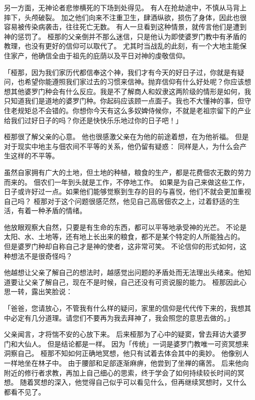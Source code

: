 \documentclass[twoside,openany]{book}
\begin{document}
另一方面，无神论者悲惨横死的下场到处得见。
有人在抢劫途中，不慎从马背上摔下，头颅破裂。
加之他们向来不注重卫生，肆酒纵欲，损伤了身体，因此也很容易被传染病袭击，往往死亡无数。
有人一旦看到这种情景，就传言他们是遭到神的惩罚了。
桠那的父亲倒并不那么迷信，只是他认为即使婆罗门教中有矛盾的教理，也没有更好的信仰可以取代了。
尤其时当战乱的此刻，有一个大地主能保住家产，他确信全由于祖先的庇荫以及平日对神的虔敬信仰。

「桠那，因为我们家历代都信奉这个神，我们才有今天的好日子过，你就是有疑问，也希望你能遵照我们家过去的习惯来信神。抛弃信仰有什么好处呢？你应该想想其他婆罗门种会有什么反应。我是不了解商人和奴隶这两阶级的情形是如何，我只知道我们是道地的婆罗门种。你起码应该顾一点面子。我也不大懂神的事，但守住老规矩总不会错的。你想你今天有这么多奴婢侍候你，不就是老祖宗留下的产业给我们过好日子的吗？你还是快快乐乐地过你的日子吧！」

桠那很了解父亲的心意。
他也很感激父亲在为他的前途着想，在为他祈福。
但是对于现实中地主与佃农间不平等的关系，他仍留有疑惑：
同样是人，为什么会产生这样的不平等。

虽然自家拥有广大的土地，但土地的种植，粮食的生产，都是花费佃农无数的劳力而来的。
佃农们一年到头就是工作，不停地工作。
如果是为自己来做这些工作，日子或许好过一点。如果他们能够觉察到生存的目的与喜悦，他们不就会更加重视自己吗？
桠那对于这个问题很感茫然，他见自己高居佃农之上，过着舒适的生活，有着一种矛盾的情绪。

他放眼观察大自然，只要是有生命的东西，都可以平等地承受神的光芒。
不论是太阳、水、土地等，还有地上长出来的粮食，都不是某个特定的人所能独占的。
但是婆罗门种却自称自己才是神的使者，这非常可笑。
不论信仰的形式如何，这种想法不是很奇怪吗？

他越想让父亲了解自己的想法时，越感觉出问题的矛盾处而无法理出头绪来。他知道要让父亲了解自己，现在不是时候，自己还没有可资说服的能力。
桠那因此心思一转，露出笑脸说：

「爸爸，您请放心，不管我有什么样的疑问，家里的信仰是代代传下来的，我想其中必定有几分道理。请您们不要再为我去拜神了，我会照您的意思去做的。」

父亲闻言，才将惴不安的心放下来。
后来桠那为了心中的疑窦，曾去拜访大婆罗门和大仙人。
但是结论都是一样。
因为「传统」一词是婆罗门教唯一可资冥想来洞察自己。
桠那不知如何正确地冥想，他只有试着去体会其中的奥妙。
他像别人一样地坐在林子中。
由于腰部和足部逐渐麻痹，他尝到了坐禅的痛苦。
后来他向附近的修行者求教，再加上自己细心的思索，终于学会了如何持续较长时间的冥想。
随着冥想的深入，他觉得自己似乎可以看见什么，但再继续冥想时，又什么都看不见了。
\end{document}
